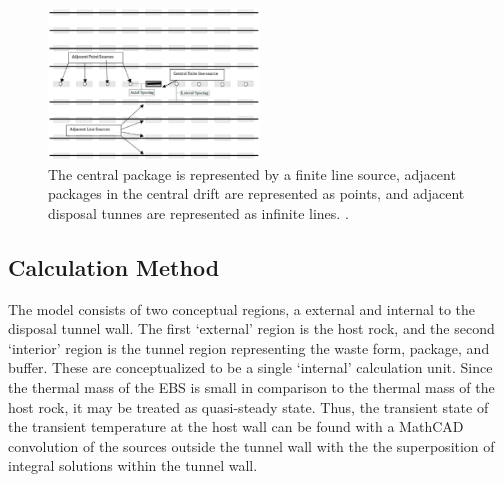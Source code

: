 \documentclass{anstrans}
\begin{document}
\begin{figure}[h!]
  \begin{center}
    \includegraphics[width=0.5\textwidth]{llnlConcept.eps}
  \end{center}
  \caption{The central package is represented by a finite line source, adjacent 
  packages in the central drift are represented as points, and adjacent disposal 
  tunnes are represented as infinite lines.
  \cite{sutton_investigations_2011}.}
  \label{fig:llnl}
\end{figure}

\subsection{Calculation Method}

The model consists of two conceptual regions, a external and internal to the 
disposal tunnel wall.  The first `external' region is the host rock, and the second 
`interior' region is the tunnel region representing the waste form, package, and 
buffer. These are conceptualized to be a single `internal' calculation unit.  
Since the thermal mass of the \gls{EBS} is small in comparison to the thermal 
mass of the host rock, it may be treated as quasi-steady state. Thus, the 
transient state of the transient temperature at the host wall can be found with 
a MathCAD convolution of the sources outside the tunnel wall with the the 
superposition of integral solutions within the tunnel wall. 
\end{document}
